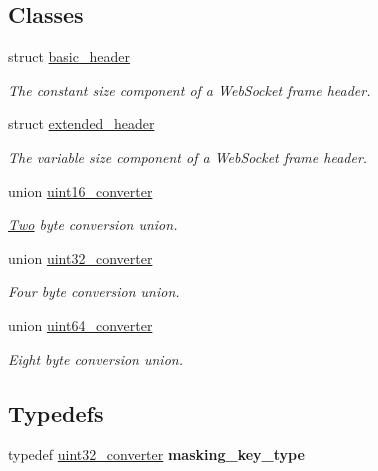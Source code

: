 \subsection*{Classes}
\begin{DoxyCompactItemize}
\item 
struct \mbox{\hyperlink{structwebsocketpp_1_1frame_1_1basic__header}{basic\+\_\+header}}
\begin{DoxyCompactList}\small\item\em The constant size component of a Web\+Socket frame header. \end{DoxyCompactList}\item 
struct \mbox{\hyperlink{structwebsocketpp_1_1frame_1_1extended__header}{extended\+\_\+header}}
\begin{DoxyCompactList}\small\item\em The variable size component of a Web\+Socket frame header. \end{DoxyCompactList}\item 
union \mbox{\hyperlink{unionwebsocketpp_1_1frame_1_1uint16__converter}{uint16\+\_\+converter}}
\begin{DoxyCompactList}\small\item\em \mbox{\hyperlink{struct_two}{Two}} byte conversion union. \end{DoxyCompactList}\item 
union \mbox{\hyperlink{unionwebsocketpp_1_1frame_1_1uint32__converter}{uint32\+\_\+converter}}
\begin{DoxyCompactList}\small\item\em Four byte conversion union. \end{DoxyCompactList}\item 
union \mbox{\hyperlink{unionwebsocketpp_1_1frame_1_1uint64__converter}{uint64\+\_\+converter}}
\begin{DoxyCompactList}\small\item\em Eight byte conversion union. \end{DoxyCompactList}\end{DoxyCompactItemize}
\subsection*{Typedefs}
\begin{DoxyCompactItemize}
\item 
\mbox{\label{namespacewebsocketpp_1_1frame_a8bdac8ec44c78c027fcf55aa3bad3f86}} 
typedef \mbox{\hyperlink{unionwebsocketpp_1_1frame_1_1uint32__converter}{uint32\+\_\+converter}} {\bfseries masking\+\_\+key\+\_\+type}
\end{DoxyCompactItemize}
